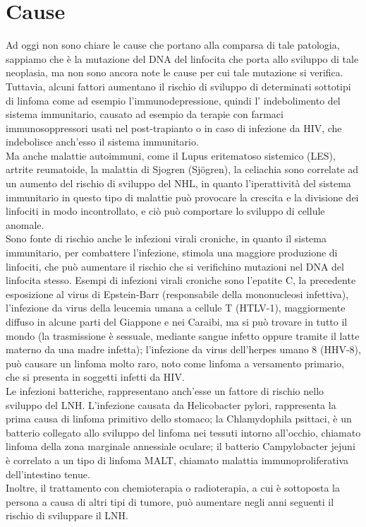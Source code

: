 \section{Cause}
Ad oggi non sono chiare le cause che portano alla comparsa di tale patologia, sappiamo che è la mutazione del 
DNA del linfocita che porta allo sviluppo di tale neoplasia, ma non sono ancora note le cause per cui tale 
mutazione si verifica.\\ 
Tuttavia, alcuni fattori aumentano il rischio di sviluppo di determinati sottotipi di linfoma come ad esempio 
l’immunodepressione, quindi l’ indebolimento del sistema immunitario, causato ad esempio da terapie con farmaci 
immunosoppressori usati nel post-trapianto o in caso di infezione da HIV, che indebolisce anch’esso 
il sistema immunitario.\\ 

Ma anche malattie autoimmuni, come il Lupus eritematoso sistemico (LES), artrite reumatoide, 
la malattia di Sjogren (Sjögren), la celiachia sono correlate ad un aumento del rischio di sviluppo del NHL, 
in quanto l’iperattività del sistema immunitario in questo tipo di malattie può provocare la crescita e la 
divisione dei linfociti in modo incontrollato, 
e ciò può comportare lo sviluppo di cellule anomale\cite{AMERICANCS}.\\

Sono fonte di rischio anche le infezioni virali croniche, in quanto il sistema immunitario, 
per combattere l’infezione, stimola una maggiore produzione di linfociti, che può aumentare il rischio che si 
verifichino mutazioni nel DNA del linfocita stesso. Esempi di infezioni virali croniche sono l’epatite C, 
la precedente esposizione al virus di Epstein-Barr (responsabile della mononucleosi infettiva), 
l'infezione da virus della leucemia umana a cellule T (HTLV-1), maggiormente diffuso in alcune parti del 
Giappone e nei Caraibi, ma si può trovare in tutto il mondo (la trasmissione è sessuale, mediante sangue infetto 
oppure tramite il latte materno da una madre infetta); l’infezione da virus dell'herpes umano 8 (HHV-8), 
può causare un linfoma molto raro, noto come linfoma a versamento primario, che si presenta in soggetti infetti da HIV.\\

Le infezioni batteriche, rappresentano anch’esse un fattore di rischio nello sviluppo del LNH. 
L’infezione causata da Helicobacter pylori, rappresenta la prima causa di linfoma primitivo dello stomaco; 
la Chlamydophila psittaci, è un batterio collegato allo sviluppo del linfoma nei tessuti intorno all’occhio, 
chiamato linfoma della zona marginale annessiale oculare; il batterio Campylobacter jejuni è correlato a un tipo 
di linfoma MALT, chiamato malattia immunoproliferativa dell'intestino tenue\cite{AMERICANCS}.\\
Inoltre, il trattamento con chemioterapia o radioterapia, a cui è sottoposta la persona a causa di altri tipi di tumore, 
può aumentare negli anni seguenti  il rischio di sviluppare il LNH\cite{AMERICANCS}.\\

